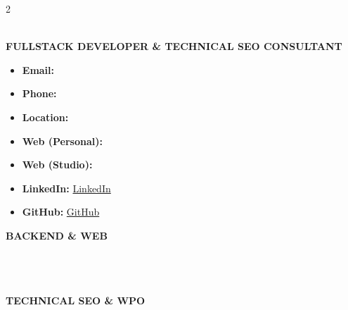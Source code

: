\documentclass[10pt,a4paper]{article}
\begin{document}
\begin{paracol}{2}

\begin{center}
  
  \vspace{1.0em}
  {\color{primary}\LARGE\bfseries \myname} \\[0.2em]
  {\color{accent}\small\bfseries FULLSTACK DEVELOPER \& TECHNICAL SEO CONSULTANT}
\end{center}

\small
\begin{itemize}[label={}, leftmargin=0.2cm]
  \item \textbf{\color{accent}Email:} \href{mailto:\myemail}{\myemail}
  \item \textbf{\color{accent}Phone:} \href{tel:\myphone}{\myphone}
  \item \textbf{\color{accent}Location:} \mylocation
  \item \textbf{\color{accent}Web (Personal):} \href{https://\myweb}{\myweb}
  \item \textbf{\color{accent}Web (Studio):} \href{https://\mywebwalkiria}{\mywebwalkiria}
  \item \textbf{\color{accent}LinkedIn:} \href{https://\mylinkedin}{LinkedIn}
  \item \textbf{\color{accent}GitHub:} \href{https://\mygithub}{GitHub}
\end{itemize}

\textbf{\color{primary}\footnotesize BACKEND \& WEB} \\
   \\
   \\
   \\

\vspace{0.4em}
\textbf{\color{primary}\footnotesize TECHNICAL SEO \& WPO} \\
  \\
  \\
  \\
 


\end{paracol}
\end{document}
